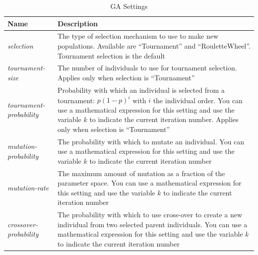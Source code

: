 \documentclass{report}
\begin{document}
\begin{table}[h!tb]\caption{GA Settings}\label{tab:ga_settings}\vspace{0.1in}
	\centering

	\begin{tabular}{p{4cm} p{12cm}}
		\toprule
		\textbf{Name} & \textbf{Description} \\
		\midrule
		\textit{selection} & The type of selection mechanism to use to make
		                     new populations. Available are ``Tournament'' and
		                     ``RouletteWheel''. Tournament selection is the
		                     default \\
		\textit{tournament-size} & The number of individuals to use for
		                           tournament selection. Applies only when
		                           selection is ``Tournament'' \\
		\textit{tournament-probability} & Probability with which an individual
		                                  is selected from a tournament:
		                                  $p (1 - p)^i$ with $i$ the individual
		                                  order. You can use a mathematical
		                                  expression for this setting and use
		                                  the variable $k$ to indicate the
		                                  current iteration number. Applies only
		                                  when selection is ``Tournament'' \\
		\textit{mutation-probability} & The probability with which to mutate an
		                                individual. You can use a mathematical
		                                expression for this setting and use
		                                the variable $k$ to indicate the
		                                current iteration number \\
		\textit{mutation-rate} & The maximum amount of mutation as a fraction
		                         of the parameter space. You can use a mathematical
		                         expression for this setting and use
		                         the variable $k$ to indicate the
		                         current iteration number \\
		\textit{crossover-probability} & The probability with which to use
		                                 cross-over to create a new individual
		                                 from two selected parent individuals.
		                                 You can use a mathematical
		                                 expression for this setting and use
		                                 the variable $k$ to indicate the
		                                 current iteration number \\
		\bottomrule
	\end{tabular}
\end{table}
\end{document}
